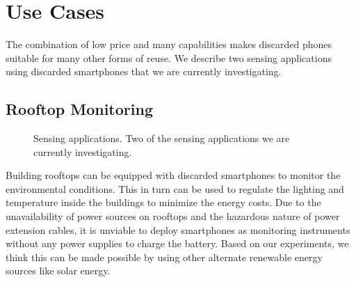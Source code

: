 \section{Use Cases}
\label{sec-usecases}
The combination of low price and many capabilities makes discarded phones
suitable for many other forms of reuse. 
We describe two sensing applications using discarded smartphones that we are
currently investigating.
\subsection{Rooftop Monitoring}
\label{sec-rooftop}
\begin{figure}[t]
  \centering
  \quad


  \vspace*{-0.1in}

  \caption{\small Sensing applications.
  \textnormal{Two of the sensing applications we are currently investigating.}}

  \vspace*{-0.1in}

\end{figure}
Building rooftops can be equipped with discarded smartphones to monitor the
environmental conditions. This in turn can be used to regulate the lighting and
temperature inside the buildings to minimize the energy costs.
Due to the unavailability of power sources on rooftops and the hazardous nature of
power extension cables, it is unviable to deploy smartphones as monitoring
instruments without any power supplies to charge the battery.
Based on our experiments, we think this can be made possible by using other
alternate renewable energy sources like solar energy.

